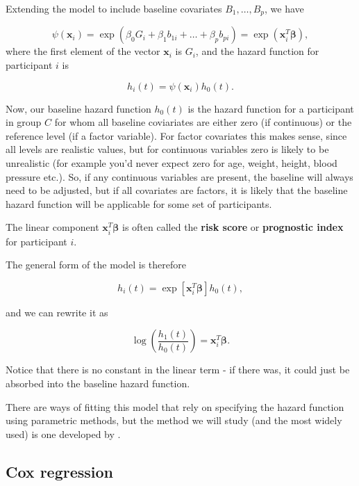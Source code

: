 \documentclass[
  openany]{book}
\theoremstyle{definition}
\theoremstyle{definition}
\theoremstyle{definition}
\theoremstyle{definition}
\theoremstyle{remark}
\begin{document}
Extending the model to include baseline covariates \(B_1,\ldots,B_p\), we have

\[\psi\left(\mathbf{x}_i\right) = \exp\left(\beta_0 G_i + \beta_1b_{1i} + \ldots + \beta_p b_{pi}\right) = \exp\left(\mathbf{x}_i^T \boldsymbol\beta\right),\]
where the first element of the vector \(\mathbf{x}_i\) is \(G_i\), and the hazard function for participant \(i\) is

\[h_i\left(t\right) = \psi\left(\mathbf{x}_i\right)h_0\left(t\right). \]

Now, our baseline hazard function \(h_0\left(t\right)\) is the hazard function for a participant in group \(C\) for whom all baseline coviariates are either zero (if continuous) or the reference level (if a factor variable). For factor covariates this makes sense, since all levels are realistic values, but for continuous variables zero is likely to be unrealistic (for example you'd never expect zero for age, weight, height, blood pressure etc.). So, if any continuous variables are present, the baseline will always need to be adjusted, but if all covariates are factors, it is likely that the baseline hazard function will be applicable for some set of participants.

The linear component \(\mathbf{x}_i^T\boldsymbol\beta\) is often called the \textbf{risk score} or \textbf{prognostic index} for participant \(i\).

The general form of the model is therefore

\begin{equation}
h_i\left(t\right) = \exp\left[\mathbf{x}_i^T\boldsymbol\beta\right]h_0\left(t\right),
\label{eq:hazfun}
\end{equation}

and we can rewrite it as

\[\log\left(\frac{h_1\left(t\right)}{h_0\left(t\right)}\right) = \mathbf{x}_i^T\boldsymbol\beta.\]

Notice that there is no constant in the linear term - if there was, it could just be absorbed into the baseline hazard function.

There are ways of fitting this model that rely on specifying the hazard function using parametric methods, but the method we will study (and the most widely used) is one developed by \citet{cox1972regression}.

\hypertarget{cox-regression}{%
\subsection{Cox regression}\label{cox-regression}}
\end{document}
